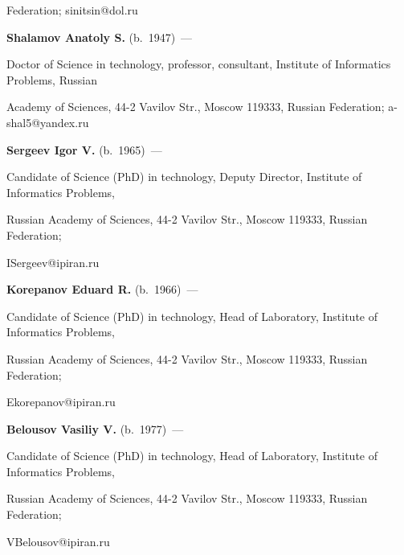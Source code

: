 Federation; sinitsin@dol.ru



\vspace*{3pt}



\noindent

\textbf{Shalamov Anatoly S.} (b.\ 1947)~---

Doctor of Science in technology, professor, consultant, Institute of Informatics Problems, Russian

Academy of Sciences, 44-2 Vavilov Str., Moscow 119333, Russian Federation; a-shal5@yandex.ru



\vspace*{3pt}



\noindent

\textbf{Sergeev Igor V.} (b.\ 1965)~---

Candidate of Science (PhD) in technology, Deputy Director, Institute of Informatics Problems,

Russian Academy of Sciences, 44-2 Vavilov Str., Moscow 119333, Russian Federation;

ISergeev@ipiran.ru



\vspace*{3pt}



\noindent

\textbf{Korepanov Eduard R.} (b.\ 1966)~---

Candidate of Science (PhD) in technology, Head of Laboratory, Institute of Informatics Problems,

Russian Academy of Sciences, 44-2 Vavilov Str., Moscow 119333, Russian Federation;

Ekorepanov@ipiran.ru



\vspace*{3pt}



\noindent

\textbf{Belousov Vasiliy V.} (b.\ 1977)~---

Candidate of Science (PhD) in technology, Head of Laboratory, Institute of Informatics Problems,

Russian Academy of Sciences, 44-2 Vavilov Str., Moscow 119333, Russian Federation;

VBelousov@ipiran.ru



